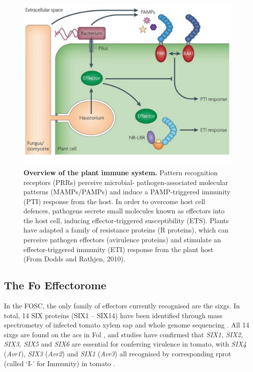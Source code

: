 \begin{figure}[p!]
    \centering
    \includegraphics[width=14cm]{Figures/DoddsArticleModel.pdf}
    \caption[Overview of the plant immune system.]{\textbf{Overview of the plant immune system.} Pattern recognition receptors (PRRs) perceive microbial- pathogen-associated molecular patterns (MAMPs/PAMPs) and induce a PAMP-triggered immunity (PTI) response from the host. In order to overcome host cell defences, pathogens secrete small molecules known as effectors into the host cell, inducing effector-triggered susceptibility (ETS). Plants have adapted a family of resistance proteins (R proteins), which can perceive pathogen effectors (avirulence proteins) and stimulate an effector-triggered immunity (ETI) response from the plant host (From Dodds and Rathjen, 2010).}
    \label{fig:PlantImmuneSystem}
\end{figure}

\subsection{The \acl{Fo} Effectorome}

In the \ac{FOSC}, the only family of effectors currently recognised are the \acp{sixg}. In total, 14 SIX proteins (SIX1 – SIX14) have been identified through mass spectrometry of infected tomato xylem sap and whole genome sequencing \parencite{Houterman2007}.  All 14 \acp{sixg} are found on the \acp{ac} in \ac{Fol} \parencite{Schmidt2013}, and studies have confirmed that \textit{SIX1, SIX2, SIX3, SIX5} and \textit{SIX6} are essential for conferring virulence in tomato, with  \textit{SIX4} (\textit{Avr1}), \textit{SIX3} (\textit{Avr2}) and \textit{SIX1} (\textit{Avr3}) all recognised by corresponding \ac{rprot} (called ‘I-’ for Immunity) in tomato \parencite{Rep2004, Lievens2009, Takken2010, Gawehns2014, Ma2015}.  

